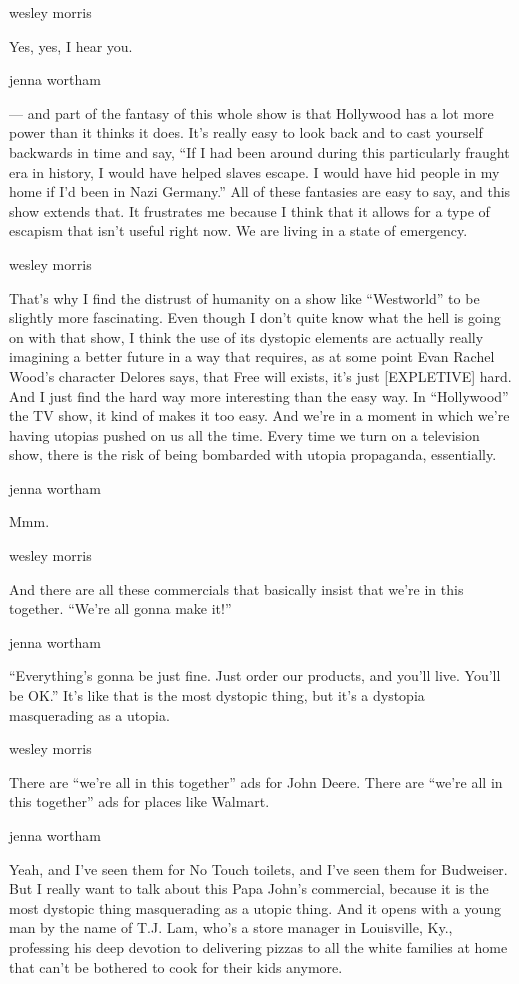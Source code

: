wesley morris

Yes, yes, I hear you.

jenna wortham

--- and part of the fantasy of this whole show is that Hollywood has a
lot more power than it thinks it does. It's really easy to look back and
to cast yourself backwards in time and say, ``If I had been around
during this particularly fraught era in history, I would have helped
slaves escape. I would have hid people in my home if I'd been in Nazi
Germany.'' All of these fantasies are easy to say, and this show extends
that. It frustrates me because I think that it allows for a type of
escapism that isn't useful right now. We are living in a state of
emergency.

wesley morris

That's why I find the distrust of humanity on a show like ``Westworld''
to be slightly more fascinating. Even though I don't quite know what the
hell is going on with that show, I think the use of its dystopic
elements are actually really imagining a better future in a way that
requires, as at some point Evan Rachel Wood's character Delores says,
that Free will exists, it's just {[}EXPLETIVE{]} hard. And I just find
the hard way more interesting than the easy way. In ``Hollywood'' the TV
show, it kind of makes it too easy. And we're in a moment in which we're
having utopias pushed on us all the time. Every time we turn on a
television show, there is the risk of being bombarded with utopia
propaganda, essentially.

jenna wortham

Mmm.

wesley morris

And there are all these commercials that basically insist that we're in
this together. ``We're all gonna make it!''

jenna wortham

``Everything's gonna be just fine. Just order our products, and you'll
live. You'll be OK.'' It's like that is the most dystopic thing, but
it's a dystopia masquerading as a utopia.

wesley morris

There are ``we're all in this together'' ads for John Deere. There are
``we're all in this together'' ads for places like Walmart.

jenna wortham

Yeah, and I've seen them for No Touch toilets, and I've seen them for
Budweiser. But I really want to talk about this Papa John's commercial,
because it is the most dystopic thing masquerading as a utopic thing.
And it opens with a young man by the name of T.J. Lam, who's a store
manager in Louisville, Ky., professing his deep devotion to delivering
pizzas to all the white families at home that can't be bothered to cook
for their kids anymore.

